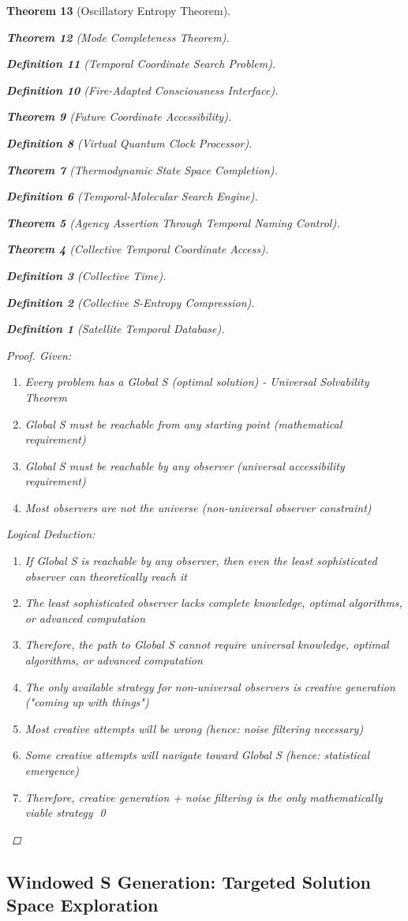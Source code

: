 \documentclass[12pt,a4paper]{article}
\newtheorem{theorem}{Theorem}[section]
\newtheorem{definition}[theorem]{Definition}
\begin{document}
\begin{theorem}[Oscillatory Entropy Theorem]
\begin{theorem}[Mode Completeness Theorem]
\begin{enumerate}
\begin{definition}[Temporal Coordinate Search Problem]
\begin{algorithm}
\begin{definition}[Fire-Adapted Consciousness Interface]
\begin{theorem}[Future Coordinate Accessibility]
\begin{definition}[Virtual Quantum Clock Processor]
\begin{itemize}
\begin{itemize}
\begin{theorem}[Thermodynamic State Space Completion]
\begin{definition}[Temporal-Molecular Search Engine]
\begin{theorem}[Agency Assertion Through Temporal Naming Control]
\begin{remark}
\begin{theorem}[Collective Temporal Coordinate Access]
\begin{definition}[Collective Time]
\begin{definition}[Collective S-Entropy Compression]
\begin{definition}[Satellite Temporal Database]
\begin{algorithm}
\begin{table}[h]
{{\begin{proof}
Given:
\begin{enumerate}
\item Every problem has a Global S (optimal solution) - Universal Solvability Theorem
\item Global S must be reachable from any starting point (mathematical requirement)
\item Global S must be reachable by any observer (universal accessibility requirement)
\item Most observers are not the universe (non-universal observer constraint)
\end{enumerate}

Logical Deduction:
\begin{enumerate}
\item If Global S is reachable by any observer, then even the least sophisticated observer can theoretically reach it
\item The least sophisticated observer lacks complete knowledge, optimal algorithms, or advanced computation
\item Therefore, the path to Global S cannot require universal knowledge, optimal algorithms, or advanced computation
\item The only available strategy for non-universal observers is creative generation ("coming up with things")
\item Most creative attempts will be wrong (hence: noise filtering necessary)
\item Some creative attempts will navigate toward Global S (hence: statistical emergence)
\item Therefore, creative generation + noise filtering is the only mathematically viable strategy \qed
\end{enumerate}
\end{proof}

\subsection{Windowed S Generation: Targeted Solution Space Exploration}

}}
\end{table}
\end{algorithm}
\end{definition}
\end{definition}
\end{definition}
\end{theorem}
\end{remark}
\end{theorem}
\end{definition}
\end{theorem}
\end{itemize}
\end{itemize}
\end{definition}
\end{theorem}
\end{definition}
\end{algorithm}
\end{definition}
\end{enumerate}
\end{theorem}
\end{theorem}
\end{document}
